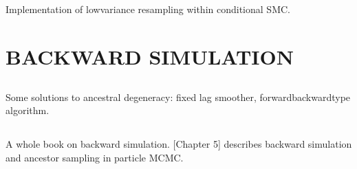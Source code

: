 \documentclass{article}
\begin{document}
\subsection*{\cite{lee2019}}
Implementation of lowvariance resampling within conditional SMC.

\subsection*{\cite{murray2016}}


\subsection*{\cite{whitley1994}}


\subsection*{\cite{carpenter1999}}


\subsection*{\cite{gerber2017}}


\subsection*{\cite{li2020}}


\subsection*{\cite{delmoral2012}}


%
\section*{BACKWARD SIMULATION}

\subsection*{\cite{kitagawa1996}}
Some solutions to ancestral degeneracy: fixed lag smoother, forwardbackwardtype algorithm.

\subsection*{\cite{doucet2009}}


\subsection*{\cite{lindsten2013}}
A whole book on backward simulation. [Chapter 5] describes backward simulation and ancestor sampling in particle MCMC.
\end{document}
